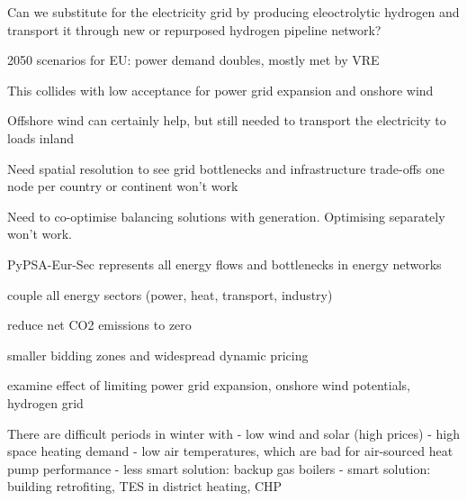 Can we substitute for the electricity grid by producing eleoctrolytic hydrogen
and transport it through new or repurposed hydrogen pipeline network?

2050 scenarios for EU: power demand doubles, mostly met by VRE

This collides with low acceptance for power grid expansion and onshore wind

Offshore wind can certainly help, but still needed to transport the electricity to loads inland

Need spatial resolution to see grid bottlenecks and infrastructure trade-offs
one node per country or continent won't work

Need to co-optimise balancing solutions with generation. Optimising separately won't work.

PyPSA-Eur-Sec represents all energy flows and bottlenecks in energy networks

couple all energy sectors (power, heat, transport, industry)

reduce net CO2 emissions to zero

smaller bidding zones and widespread dynamic pricing

examine effect of limiting power grid expansion, onshore wind potentials, hydrogen grid

There are difficult periods in winter with
- low wind and solar (high prices)
- high space heating demand
- low air temperatures, which are bad for air-sourced heat pump performance
- less smart solution: backup gas boilers
- smart solution: building retrofiting, TES in district heating, CHP